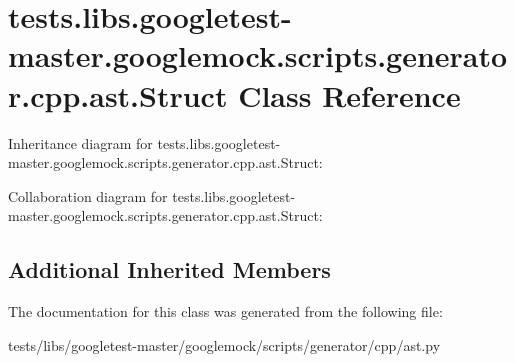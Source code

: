 \hypertarget{classtests_1_1libs_1_1googletest-master_1_1googlemock_1_1scripts_1_1generator_1_1cpp_1_1ast_1_1Struct}{}\section{tests.\+libs.\+googletest-\/master.googlemock.\+scripts.\+generator.\+cpp.\+ast.\+Struct Class Reference}
\label{classtests_1_1libs_1_1googletest-master_1_1googlemock_1_1scripts_1_1generator_1_1cpp_1_1ast_1_1Struct}


Inheritance diagram for tests.\+libs.\+googletest-\/master.googlemock.\+scripts.\+generator.\+cpp.\+ast.\+Struct\+:


Collaboration diagram for tests.\+libs.\+googletest-\/master.googlemock.\+scripts.\+generator.\+cpp.\+ast.\+Struct\+:
\subsection*{Additional Inherited Members}


The documentation for this class was generated from the following file\+:\begin{DoxyCompactItemize}
\item 
tests/libs/googletest-\/master/googlemock/scripts/generator/cpp/ast.\+py\end{DoxyCompactItemize}
